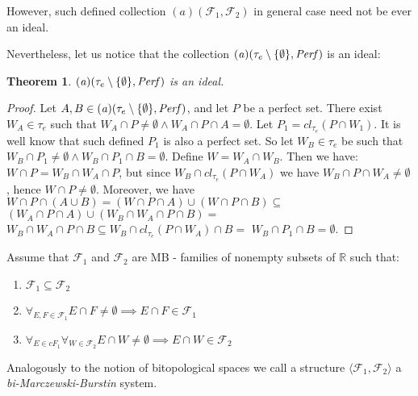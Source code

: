 \documentclass[12pt]{amsart}
\theoremstyle{plain}
\newtheorem{theorem}{Theorem}[section]
\theoremstyle{definition}
\theoremstyle{remark}
\newcommand{\cl}{\mathit{cl}}
\newcommand{\Perf}{{\it Perf}}
\newcommand{\real}{\mathbb{R}}
\newcommand{\cF}{{\mathcal F}}
\newcommand{\aideal}{\mathit{(a)}}
\newcommand{\biMB}{bi-Marczewski-Burstin}
\begin{document}
However, such defined collection $\aideal(\cF_1, \cF_2)$
in general case need not be ever an ideal.

Nevertheless, let us notice that the collection
$\aideal(\tau_e\setminus\lbrace\emptyset\rbrace, \Perf)$ is an ideal:
\begin{theorem}
$\aideal(\tau_e\setminus\lbrace\emptyset\rbrace, \Perf)$ is an ideal.
\end{theorem}
\begin{proof}
Let $A, B \in \aideal(\tau_e\setminus\lbrace\emptyset\rbrace, \Perf)$,
and let $P$ be a perfect set. 
There exist $W_A \in \tau_e$ such that 
$W_A \cap P \not= \emptyset \wedge W_A \cap P \cap A = \emptyset$.
Let $P_1 = \cl_{\tau_e}(P \cap W_1)$. It is well know that such defined
$P_1$ is also a perfect set. So let $W_B \in \tau_e$ 
be such that 
$W_B \cap P_1 \not= \emptyset \wedge W_B \cap P_1 \cap B = \emptyset$.
Define $W = W_A \cap W_B$. Then we have:
$W \cap P = W_B \cap W_A \cap P$, 
but since $W_B \cap \cl_{\tau_e}(P \cap W_A)$
we have $W_B \cap P \cap W_A \not= \emptyset$,
hence $W \cap P \not= \emptyset$.
Moreover, we have
$W \cap P \cap (A \cup B) = (W \cap P \cap A) \cup (W \cap P \cap B) \subseteq$
$(W_A \cap P \cap A) \cup (W_B \cap W_A \cap P \cap B) =$
$W_B \cap W_A \cap P \cap B \subseteq W_B \cap \cl_{\tau_e} (P \cap W_A) \cap B =$
$W_B \cap P_1 \cap B = \emptyset$.
\end{proof}

Assume that $\cF_1$ and $\cF_2$ are MB - families of nonempty 
subsets of $\real$ such that:
\begin{enumerate}	
\item
\label{mb-condition-subset}
  $\cF_1 \subseteq \cF_2$
\item 
\label{mb-condition-f1}
  $\forall_{E,F \in \cF_1} E \cap F \not= \emptyset \implies E \cap F \in \cF_1$
\item
\label{mb-condition-f1f2}
  $\forall_{E \in cF_1} \forall_{W \in \cF_2} E \cap W \not= \emptyset \implies E \cap W \in \cF_2$  
\end{enumerate}	

Analogously to the notion of bitopological spaces we call a structure
$\langle \cF_1, \cF_2 \rangle$ a {\it\biMB{}} system.
\end{document}
